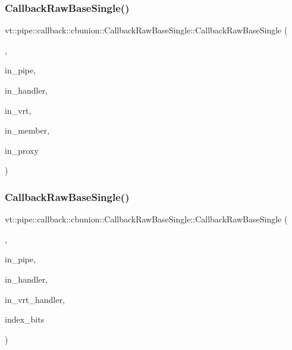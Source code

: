 \subsubsection{\texorpdfstring{Callback\+Raw\+Base\+Single()}{CallbackRawBaseSingle()}\hspace{0.1cm}{\footnotesize\ttfamily [10/13]}}
{\footnotesize\ttfamily vt\+::pipe\+::callback\+::cbunion\+::\+Callback\+Raw\+Base\+Single\+::\+Callback\+Raw\+Base\+Single (\begin{DoxyParamCaption}\item[{Raw\+Bcast\+Col\+Dir\+Tag\+Type}]{,  }\item[{\hyperlink{namespacevt_ac9852acda74d1896f48f406cd72c7bd3}{Pipe\+Type} const \&}]{in\+\_\+pipe,  }\item[{\hyperlink{namespacevt_af64846b57dfcaf104da3ef6967917573}{Handler\+Type} const \&}]{in\+\_\+handler,  }\item[{\hyperlink{structvt_1_1pipe_1_1callback_1_1cbunion_1_1_callback_raw_base_single_a734a9c83099de5bc1cd85f9da8dba7bb}{Auto\+Handler\+Type} const \&}]{in\+\_\+vrt,  }\item[{bool const \&}]{in\+\_\+member,  }\item[{\hyperlink{namespacevt_a1b417dd5d684f045bb58a0ede70045ac}{Virtual\+Proxy\+Type} const \&}]{in\+\_\+proxy }\end{DoxyParamCaption})}

\mbox{\label{structvt_1_1pipe_1_1callback_1_1cbunion_1_1_callback_raw_base_single_af249d8dc02e5b50697f33c35718a8c40}} 
\subsubsection{\texorpdfstring{Callback\+Raw\+Base\+Single()}{CallbackRawBaseSingle()}\hspace{0.1cm}{\footnotesize\ttfamily [11/13]}}
{\footnotesize\ttfamily vt\+::pipe\+::callback\+::cbunion\+::\+Callback\+Raw\+Base\+Single\+::\+Callback\+Raw\+Base\+Single (\begin{DoxyParamCaption}\item[{Raw\+Send\+Col\+Dir\+Tag\+Type}]{,  }\item[{\hyperlink{namespacevt_ac9852acda74d1896f48f406cd72c7bd3}{Pipe\+Type} const \&}]{in\+\_\+pipe,  }\item[{\hyperlink{namespacevt_af64846b57dfcaf104da3ef6967917573}{Handler\+Type} const \&}]{in\+\_\+handler,  }\item[{\hyperlink{structvt_1_1pipe_1_1callback_1_1cbunion_1_1_callback_raw_base_single_a734a9c83099de5bc1cd85f9da8dba7bb}{Auto\+Handler\+Type} const \&}]{in\+\_\+vrt\+\_\+handler,  }\item[{void $\ast$}]{index\+\_\+bits }\end{DoxyParamCaption})}

